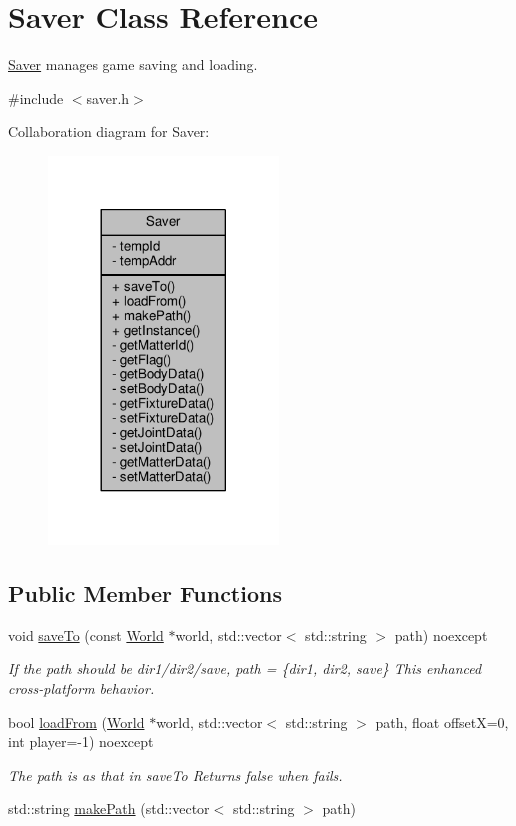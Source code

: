\hypertarget{classSaver}{}\section{Saver Class Reference}
\label{classSaver}


\hyperlink{classSaver}{Saver} manages game saving and loading.  




{\ttfamily \#include $<$saver.\+h$>$}



Collaboration diagram for Saver\+:
\nopagebreak
\begin{figure}[H]
\begin{center}
\leavevmode
\includegraphics[width=173pt]{classSaver__coll__graph}
\end{center}
\end{figure}
\subsection*{Public Member Functions}
\begin{DoxyCompactItemize}
\item 
void \hyperlink{classSaver_a999e36bd249d1ed0bf4748991a72d2f9}{save\+To} (const \hyperlink{classWorld}{World} $\ast$world, std\+::vector$<$ std\+::string $>$ path) noexcept
\begin{DoxyCompactList}\small\item\em If the path should be dir1/dir2/save, path = \{dir1, dir2, save\} This enhanced cross-\/platform behavior. \end{DoxyCompactList}\item 
bool \hyperlink{classSaver_a349f98e86636f4ba13a8912b8d56a235}{load\+From} (\hyperlink{classWorld}{World} $\ast$world, std\+::vector$<$ std\+::string $>$ path, float offset\+X=0, int player=-\/1) noexcept
\begin{DoxyCompactList}\small\item\em The path is as that in save\+To Returns false when fails. \end{DoxyCompactList}\item 
std\+::string \hyperlink{classSaver_a9483a0cd5284f84cb3b138aa44b6969e}{make\+Path} (std\+::vector$<$ std\+::string $>$ path)
\end{DoxyCompactItemize}
